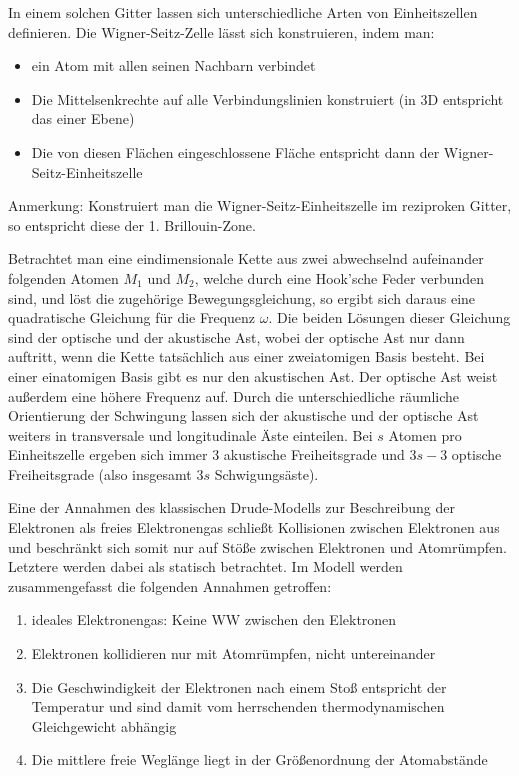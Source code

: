 In einem solchen Gitter lassen sich unterschiedliche Arten von Einheitszellen definieren. Die Wigner-Seitz-Zelle lässt sich konstruieren, indem man:
\begin{itemize}
    \item ein Atom mit allen seinen Nachbarn verbindet
    \item Die Mittelsenkrechte auf alle Verbindungslinien konstruiert (in 3D entspricht das einer Ebene)
    \item Die von diesen Flächen eingeschlossene Fläche entspricht dann der Wigner-Seitz-Einheitszelle
\end{itemize}
Anmerkung: Konstruiert man die Wigner-Seitz-Einheitszelle im reziproken Gitter, so entspricht diese der 1. Brillouin-Zone.

\label{q:55}

Betrachtet man eine eindimensionale Kette aus zwei abwechselnd aufeinander folgenden Atomen $M_1$ und $M_2$, welche durch eine Hook'sche Feder verbunden sind, und löst die zugehörige Bewegungsgleichung, so ergibt sich daraus eine quadratische Gleichung für die Frequenz $\omega$. Die beiden Lösungen dieser Gleichung sind der optische und der akustische Ast, wobei der optische Ast nur dann auftritt, wenn die Kette tatsächlich aus einer zweiatomigen Basis besteht. Bei einer einatomigen Basis gibt es nur den akustischen Ast. Der optische Ast weist außerdem eine höhere Frequenz auf. Durch die unterschiedliche räumliche Orientierung der Schwingung lassen sich der akustische und der optische Ast weiters in transversale und longitudinale Äste einteilen. Bei $s$ Atomen pro Einheitszelle ergeben sich immer $3$ akustische Freiheitsgrade und $3s-3$ optische Freiheitsgrade (also insgesamt $3s$ Schwigungsäste).

\label{q:56}

Eine der Annahmen des klassischen Drude-Modells zur Beschreibung der Elektronen als freies Elektronengas schließt Kollisionen zwischen Elektronen aus und beschränkt sich somit nur auf Stöße zwischen Elektronen und Atomrümpfen. Letztere werden dabei als statisch betrachtet. Im Modell werden zusammengefasst die folgenden Annahmen getroffen:

\begin{enumerate}
    \item ideales Elektronengas: Keine WW zwischen den Elektronen
    \item Elektronen kollidieren nur mit Atomrümpfen, nicht untereinander
    \item Die Geschwindigkeit der Elektronen nach einem Stoß entspricht der Temperatur und sind damit vom herrschenden thermodynamischen Gleichgewicht abhängig
    \item Die mittlere freie Weglänge liegt in der Größenordnung der Atomabstände
\end{enumerate}

